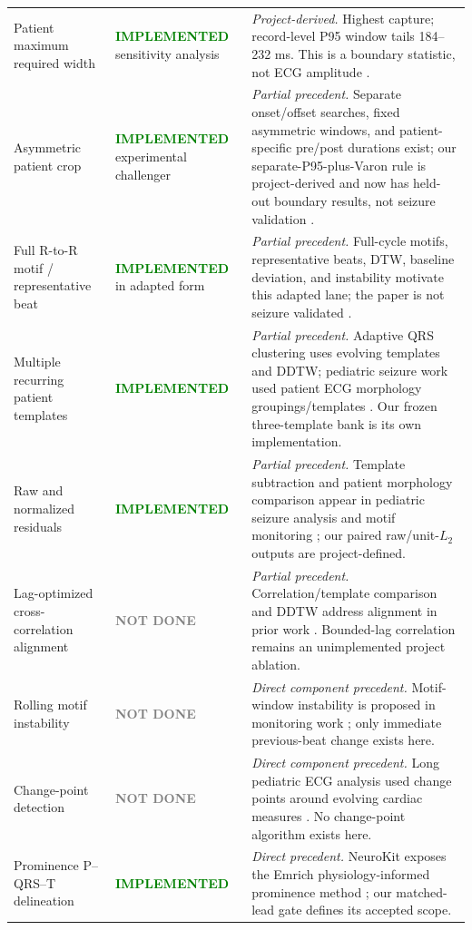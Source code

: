 \documentclass[11pt,a4paper]{article}
\newcommand{\implemented}{\textcolor{green}{\textbf{IMPLEMENTED}}}
\newcommand{\notdone}{\textcolor{gray}{\textbf{NOT DONE}}}
\begin{document}
\begin{longtable}{p{}>{\small}p{}p{}}
Patient maximum required width & \implemented{} sensitivity analysis & \emph{Project-derived.} Highest capture; record-level P95 window tails 184--232 ms. This is a boundary statistic, not ECG amplitude \cite{varon2015,illanes2007}. \\
Asymmetric patient crop & \implemented{} experimental challenger & \emph{Partial precedent.} Separate onset/offset searches, fixed asymmetric windows, and patient-specific pre/post durations exist; our separate-P95-plus-Varon rule is project-derived and now has held-out boundary results, not seizure validation \cite{martinez2004,illanes2007,singh2013,lorenz2021}. \\
Full R-to-R motif / representative beat & \implemented{} in adapted form & \emph{Partial precedent.} Full-cycle motifs, representative beats, DTW, baseline deviation, and instability motivate this adapted lane; the paper is not seizure validated \cite{motif2026}. \\
Multiple recurring patient templates & \implemented & \emph{Partial precedent.} Adaptive QRS clustering uses evolving templates and DDTW; pediatric seizure work used patient ECG morphology groupings/templates \cite{adaptiveqrs,pediatric2021}. Our frozen three-template bank is its own implementation. \\
Raw and normalized residuals & \implemented & \emph{Partial precedent.} Template subtraction and patient morphology comparison appear in pediatric seizure analysis and motif monitoring \cite{pediatric2021,motif2026}; our paired raw/unit-$L_2$ outputs are project-defined. \\
Lag-optimized cross-correlation alignment & \notdone & \emph{Partial precedent.} Correlation/template comparison and DDTW address alignment in prior work \cite{pediatric2021,adaptiveqrs}. Bounded-lag correlation remains an unimplemented project ablation. \\
Rolling motif instability & \notdone & \emph{Direct component precedent.} Motif-window instability is proposed in monitoring work \cite{motif2026}; only immediate previous-beat change exists here. \\
Change-point detection & \notdone & \emph{Direct component precedent.} Long pediatric ECG analysis used change points around evolving cardiac measures \cite{pediatric2021}. No change-point algorithm exists here. \\
Prominence P--QRS--T delineation & \implemented & \emph{Direct precedent.} NeuroKit exposes the Emrich physiology-informed prominence method \cite{emrich2024}; our matched-lead gate defines its accepted scope. \\

\end{longtable}
\end{document}
